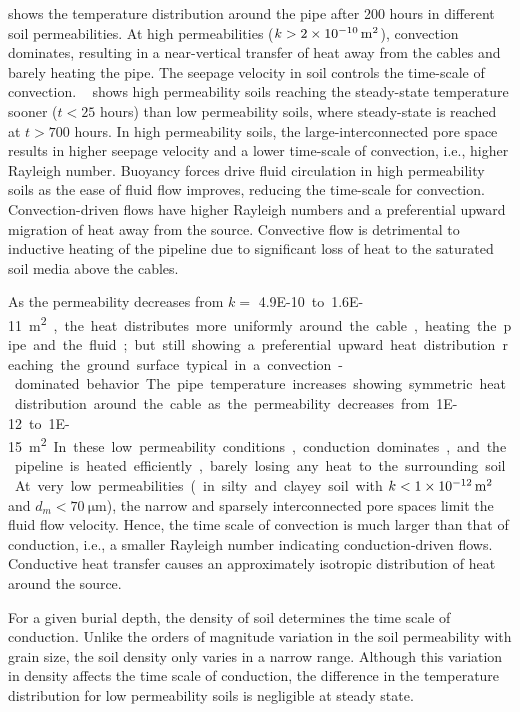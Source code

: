 \documentclass[Journal,letterpaper,InsideFigs]{ascelike-new}
\begin{document}
 shows the temperature distribution around the pipe after 200 hours in different soil permeabilities. At high permeabilities ($k > \SI{2E-10}{\meter\squared}$), convection dominates, resulting in a near-vertical transfer of heat away from the cables and barely heating the pipe. The seepage velocity in soil controls the time-scale of convection. ~ shows high permeability soils reaching the steady-state temperature sooner ($t < 25$ hours) than low permeability soils, where steady-state is reached at $t > 700$ hours. In high permeability soils, the large-interconnected pore space results in higher seepage velocity and a lower time-scale of convection, i.e., higher Rayleigh number. Buoyancy forces drive fluid circulation in high permeability soils as the ease of fluid flow improves, reducing the time-scale for convection. Convection-driven flows have higher Rayleigh numbers and a preferential upward migration of heat away from the source. Convective flow is detrimental to inductive heating of the pipeline due to significant loss of heat to the saturated soil media above the cables.

As the permeability decreases from $k =$ \SI{4.9E-10} to \SI{1.6E-11}{\meter\squared}, the heat distributes more uniformly around the cable, heating the pipe and the fluid; but still showing a preferential upward heat distribution reaching the ground surface typical in a convection-dominated behavior. The pipe temperature increases showing symmetric heat distribution around the cable as the permeability decreases from \SI{1E-12} to \SI{1E-15}{\meter\squared}. In these low permeability conditions, conduction dominates, and the pipeline is heated efficiently, barely losing any heat to the surrounding soil. At very low permeabilities (in silty and clayey soil with $k < \SI{1E-12}{\meter\squared}$ and $d_m < \SI{70}{\micro\meter}$), the narrow and sparsely interconnected pore spaces limit the fluid flow velocity. Hence, the time scale of convection is much larger than that of conduction, i.e., a smaller Rayleigh number indicating conduction-driven flows. Conductive heat transfer causes an approximately isotropic distribution of heat around the source. 

For a given burial depth, the density of soil determines the time scale of conduction. Unlike the orders of magnitude variation in the soil permeability with grain size, the soil density only varies in a narrow range. Although this variation in density affects the time scale of conduction, the difference in the temperature distribution for low permeability soils is negligible at steady state. 
\end{document}
